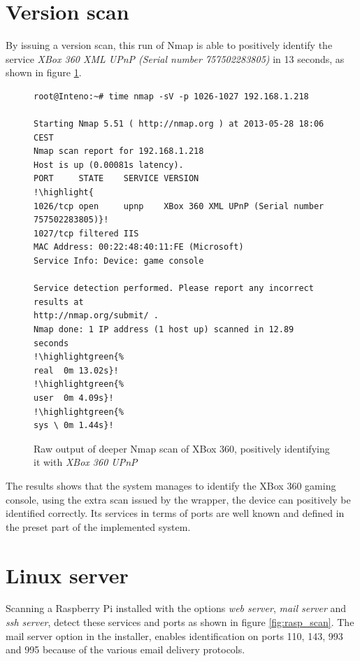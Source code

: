 \documentclass[a4paper,11pt,makeidx]{kth-bcs}
\newcommand{\reducedstrut}{\vrule width 0pt height .9\ht\strutbox depth .9\dp\strutbox\relax}
\newcommand{\highlight}[1]{%
  \begingroup
  \colorbox{light-gray!20}{\footnotesize\ttfamily#1\/}%
  \endgroup
}
\newcommand{\highlightgreen}[1]{%
  \begingroup
  \colorbox{light-green!20}{#1\/}%
  \endgroup
}
\begin{document}
\newpage
\section{Version scan}
By issuing a version scan, this run of Nmap is able to positively identify the service \emph{XBox 360 XML UPnP (Serial number 757502283805)} in 13 seconds, as shown in figure \ref{fig:nmapxbox}.
   \begin{figure}[ht]
      \centering
      \begin{lstlisting}[escapechar=!]
root@Inteno:~# time nmap -sV -p 1026-1027 192.168.1.218

Starting Nmap 5.51 ( http://nmap.org ) at 2013-05-28 18:06 CEST
Nmap scan report for 192.168.1.218
Host is up (0.00081s latency).
PORT     STATE    SERVICE VERSION
!\highlight{
1026/tcp open     upnp    XBox 360 XML UPnP (Serial number 757502283805)}!
1027/tcp filtered IIS
MAC Address: 00:22:48:40:11:FE (Microsoft)
Service Info: Device: game console

Service detection performed. Please report any incorrect results at
http://nmap.org/submit/ .
Nmap done: 1 IP address (1 host up) scanned in 12.89 seconds
!\highlightgreen{%
real  0m 13.02s}!
!\highlightgreen{%
user  0m 4.09s}!
!\highlightgreen{%
sys \ 0m 1.44s}!
      \end{lstlisting}
      \caption{
	 \small{
       Raw output of deeper Nmap scan of XBox 360, positively identifying it with \emph{XBox 360 UPnP}
	 }
      }
      \label{fig:nmapxbox}
   \end{figure}

The results shows that the system manages to identify the XBox 360 gaming console, using the extra scan issued by the wrapper, the device can positively be identified correctly.
Its services in terms of ports are well known and defined in the preset part of the implemented system.

\newpage
\section{Linux server}
Scanning a Raspberry Pi installed with the options \emph{web server}, \emph{mail server} and \emph{ssh server}, detect these services and ports as shown in figure \ref{fig:rasp_scan}.
The mail server option in the installer, enables identification on ports 110, 143, 993 and 995 because of the various email delivery protocols.
\end{document}
